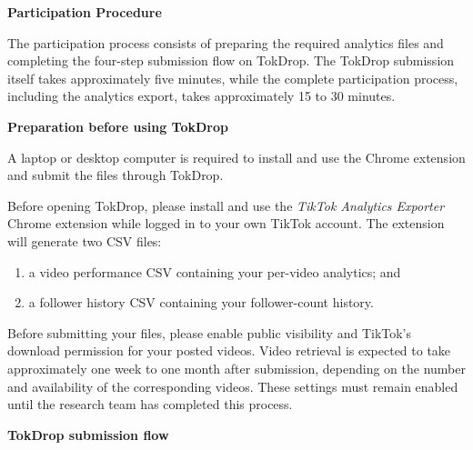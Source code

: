 \noindent\textbf{Participation Procedure}

The participation process consists of preparing the required analytics files and completing the four-step submission flow on TokDrop. The TokDrop submission itself takes approximately five minutes, while the complete participation process, including the analytics export, takes approximately 15 to 30 minutes.

\noindent\textbf{Preparation before using TokDrop}

A laptop or desktop computer is required to install and use the Chrome extension and submit the files through TokDrop.

Before opening TokDrop, please install and use the \textit{TikTok Analytics Exporter} Chrome extension while logged in to your own TikTok account. The extension will generate two CSV files:
\begin{enumerate}
    \item a video performance CSV containing your per-video analytics; and
    \item a follower history CSV containing your follower-count history.
\end{enumerate}

Before submitting your files, please enable public visibility and TikTok's download permission for your posted videos. Video retrieval is expected to take approximately one week to one month after submission, depending on the number and availability of the corresponding videos. These settings must remain enabled until the research team has completed this process.

\noindent\textbf{TokDrop submission flow}

